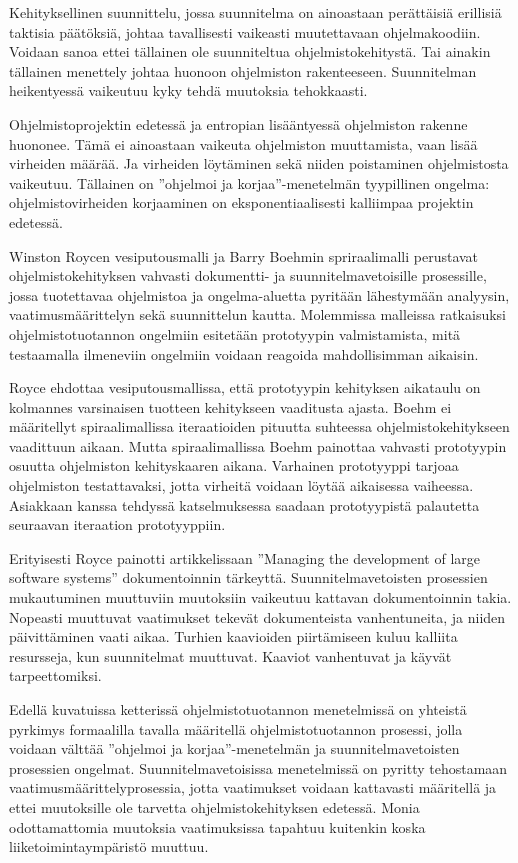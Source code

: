 \documentclass[finnish]{tktltiki2}
\theoremstyle{definition}
\theoremstyle{remark}
\begin{document}
Kehityksellinen suunnittelu, jossa suunnitelma on ainoastaan perättäisiä erillisiä taktisia päätöksiä, johtaa tavallisesti vaikeasti muutettavaan ohjelmakoodiin. Voidaan sanoa ettei tällainen ole suunniteltua ohjelmistokehitystä. Tai ainakin tällainen menettely johtaa huonoon ohjelmiston rakenteeseen. Suunnitelman heikentyessä vaikeutuu kyky tehdä muutoksia tehokkaasti\cite{FOW01b}. 

Ohjelmistoprojektin edetessä ja entropian lisääntyessä ohjelmiston rakenne huononee. Tämä ei ainoastaan vaikeuta ohjelmiston muuttamista, vaan lisää virheiden määrää. Ja virheiden löytäminen sekä niiden poistaminen ohjelmistosta vaikeutuu. Tällainen on ''ohjelmoi ja korjaa''-menetelmän tyypillinen ongelma: ohjelmistovirheiden korjaaminen on eksponentiaalisesti kalliimpaa projektin edetessä\cite{FOW01b}.

Winston Roycen vesiputousmalli\cite{ROY70} ja Barry Boehmin spriraalimalli\cite{BOE88} perustavat ohjelmistokehityksen vahvasti dokumentti- ja suunnitelmavetoisille prosessille, jossa tuotettavaa ohjelmistoa ja ongelma-aluetta pyritään lähestymään analyysin, vaatimusmäärittelyn sekä suunnittelun kautta. Molemmissa malleissa ratkaisuksi ohjelmistotuotannon ongelmiin esitetään prototyypin valmistamista, mitä testaamalla ilmeneviin ongelmiin voidaan reagoida mahdollisimman aikaisin.

Royce ehdottaa vesiputousmallissa, että prototyypin kehityksen aikataulu on kolmannes varsinaisen tuotteen kehitykseen vaaditusta ajasta\cite{ROY70}. Boehm ei määritellyt spiraalimallissa iteraatioiden pituutta suhteessa ohjelmistokehitykseen vaadittuun aikaan. Mutta spiraalimallissa Boehm painottaa vahvasti prototyypin osuutta ohjelmiston kehityskaaren aikana. Varhainen prototyyppi tarjoaa ohjelmiston testattavaksi, jotta virheitä voidaan löytää aikaisessa vaiheessa. Asiakkaan kanssa tehdyssä katselmuksessa saadaan prototyypistä palautetta seuraavan iteraation prototyyppiin\cite{BOE88}.

Erityisesti Royce painotti artikkelissaan ''Managing the development of large software systems'' dokumentoinnin tärkeyttä\cite{ROY70}. Suunnitelmavetoisten prosessien mukautuminen muuttuviin muutoksiin vaikeutuu kattavan dokumentoinnin takia. Nopeasti muuttuvat vaatimukset tekevät dokumenteista vanhentuneita, ja niiden päivittäminen vaati aikaa. Turhien kaavioiden piirtämiseen kuluu kalliita resursseja, kun suunnitelmat muuttuvat. Kaaviot vanhentuvat ja käyvät tarpeettomiksi.

Edellä kuvatuissa ketterissä ohjelmistotuotannon menetelmissä on yhteistä pyrkimys formaalilla tavalla määritellä ohjelmistotuotannon prosessi, jolla voidaan välttää ''ohjelmoi ja korjaa''-menetelmän ja suunnitelmavetoisten prosessien ongelmat. Suunnitelmavetoisissa menetelmissä on pyritty tehostamaan vaatimusmäärittelyprosessia, jotta vaatimukset voidaan kattavasti määritellä ja ettei muutoksille ole tarvetta ohjelmistokehityksen edetessä. Monia odottamattomia muutoksia vaatimuksissa tapahtuu kuitenkin koska liiketoimintaympäristö muuttuu\cite{FOW01b}.
\end{document}
